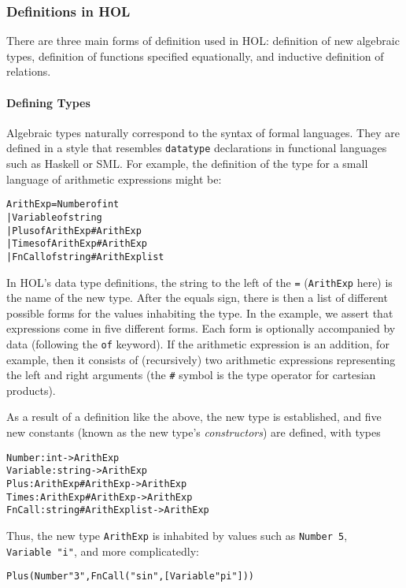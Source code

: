 \documentclass[11pt]{article}
\begin{document}
\subsubsection{Definitions in HOL}
There are three main forms of definition used in HOL: definition of
new algebraic types, definition of functions specified equationally,
and inductive definition of relations.

\paragraph{Defining Types}
Algebraic types naturally correspond to the syntax of formal
languages.  They are defined in a style that resembles
\texttt{datatype} declarations in functional languages such as Haskell
or SML.  For example, the definition of the type for a small language
of arithmetic expressions might be:
\begin{alltt}
   ArithExp = Number of int
            | Variable of string
            | Plus of ArithExp # ArithExp
            | Times of ArithExp # ArithExp
            | FnCall of string # ArithExp list
\end{alltt}
In HOL's data type definitions, the string to the left of the
\texttt{=} (\texttt{ArithExp} here) is the name of the new type.
After the equals sign, there is then a list of different possible
forms for the values inhabiting the type.  In the example, we assert
that expressions come in five different forms.  Each form is
optionally accompanied by data (following the \texttt{of} keyword).
If the arithmetic expression is an addition, for example, then it
consists of (recursively) two arithmetic expressions representing the
left and right arguments (the \texttt{\#} symbol is the type operator
for cartesian products).

As a result of a definition like the above, the new type is
established, and five new constants (known as the new type's
\emph{constructors}) are defined, with types
\begin{alltt}
   Number   : int -> ArithExp
   Variable : string -> ArithExp
   Plus     : ArithExp # ArithExp -> ArithExp
   Times    : ArithExp # ArithExp -> ArithExp
   FnCall   : string # ArithExp list -> ArithExp
\end{alltt}
Thus, the new type \texttt{ArithExp} is inhabited by values such as
\texttt{Number~5}, \texttt{Variable~"i"}, and more complicatedly:
\begin{alltt}
   Plus (Number "3", FnCall ("sin", [Variable "pi"]))
\end{alltt}
\end{document}
